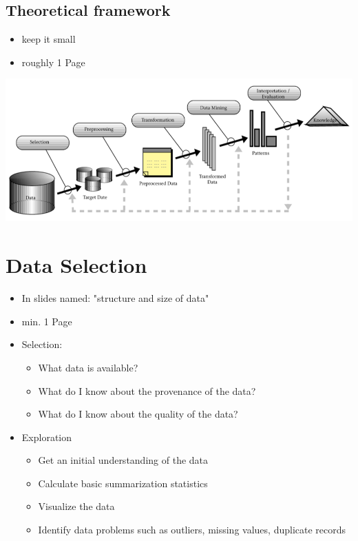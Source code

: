 \section{Theoretical framework}
\begin{itemize}
	\item keep it small
	\item roughly 1 Page
\end{itemize}
\includegraphics[width=\textwidth]{images/DM_Process.png}










\chapter{Data Selection}
\label{cha:data_selection}
\begin{itemize}
	\item In slides named: "structure and size of data"
	\item min. 1 Page
	\item Selection: 
	\begin{itemize}
		\item What data is available?
		\item What do I know about the provenance of the data?
		\item What do I know about the quality of the data?
	\end{itemize}
	\item Exploration
	\begin{itemize}
		\item Get an initial understanding of the data
		\item Calculate basic summarization statistics
		\item Visualize the data
		\item Identify data problems such as outliers, missing values, duplicate records
	\end{itemize}
\end{itemize}



